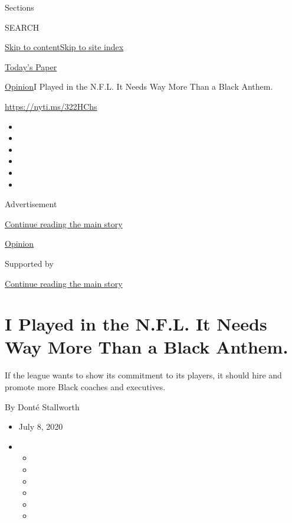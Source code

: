 Sections

SEARCH

\protect\hyperlink{site-content}{Skip to
content}\protect\hyperlink{site-index}{Skip to site index}

\href{https://myaccount.nytimes.com/auth/login?response_type=cookie\&client_id=vi}{}

\href{https://www.nytimes.com/section/todayspaper}{Today's Paper}

\href{/section/opinion}{Opinion}\textbar{}I Played in the N.F.L. It
Needs Way More Than a Black Anthem.

\href{https://nyti.ms/322HChs}{https://nyti.ms/322HChs}

\begin{itemize}
\item
\item
\item
\item
\item
\item
\end{itemize}

Advertisement

\protect\hyperlink{after-top}{Continue reading the main story}

\href{/section/opinion}{Opinion}

Supported by

\protect\hyperlink{after-sponsor}{Continue reading the main story}

\hypertarget{i-played-in-the-nfl-it-needs-way-more-than-a-black-anthem}{%
\section{I Played in the N.F.L. It Needs Way More Than a Black
Anthem.}\label{i-played-in-the-nfl-it-needs-way-more-than-a-black-anthem}}

If the league wants to show its commitment to its players, it should
hire and promote more Black coaches and executives.

By Donté Stallworth

\begin{itemize}
\item
  July 8, 2020
\item
  \begin{itemize}
  \item
  \item
  \item
  \item
  \item
  \item
  \end{itemize}
\end{itemize}

